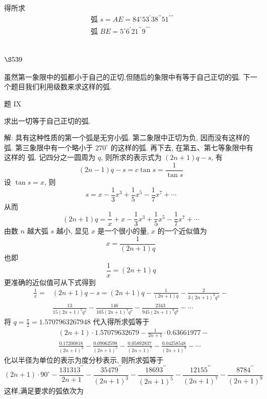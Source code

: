 得所求
\[
\begin{gathered}
\text { 弧 } s=A E=84^{\circ} 53^{\prime} 38^{\prime \prime} 51^{\prime \prime \prime} \\
\text { 弧 } B E=5^{\circ} 6^{\prime} 21^{\prime \prime} 9^{\prime \prime \prime}
\end{gathered}
\]
\section{$\S 539$}

虽然第一象限中的弧都小于自己的正切,但随后的象限中有等于自己正切的弧. 下一个题目我们利用级数来求这样的弧.

题 IX

求出一切等于自己正切的弧.

解: 具有这种性质的第一个弧是无穷小弧. 第二象限中正切为负, 因而没有这样的 弧. 第三象限中有一个略小于 $270^{\circ}$ 的这样的弧. 再下去, 在第五、第七等象限中有这样的 弧. 记四分之一圆周为 $q$, 则所求的表示式为 $(2 n+1) q-s$, 有
\[
(2 n-1) q-s=c \tan s=\frac{1}{\tan s}
\]
设 $\tan s=x$, 则
\[
s=x-\frac{1}{3} x^{3}+\frac{1}{5} x^{5}-\frac{1}{7} x^{7}+\cdots
\]
从而
\[
(2 n+1) q=\frac{1}{x}+x-\frac{1}{3} x^{3}+\frac{1}{5} x^{5}-\frac{1}{7} x^{7}+\cdots
\]
由数 $n$ 越大弧 $s$ 越小, 显见 $x$ 是一个很小的量, $x$ 的一个近似值为
\[
x=\frac{1}{(2 n+1) q}
\]
也即
\[
\frac{1}{x}=(2 n+1) q
\]
更准确的近似值可从下式得到
\[
\begin{aligned}
\frac{1}{x}= & (2 n+1) q-s=(2 n+1) q-\frac{1}{(2 n+1) q}-\frac{2}{3(2 n+1)^{3} q^{3}}- \\
& \frac{13}{15(2 n+1)^{5} q^{5}}-\frac{146}{105(2 n+1)^{7} q^{7}}-\frac{2343}{945(2 n+1)^{9} q^{9}}-\cdots
\end{aligned}
\]
将 $q=\frac{\pi}{2}=1.5707963267948$ 代入得所求弧等于
\[
\begin{aligned}
& (2 n+1) \cdot 1.57079632679-\frac{1}{2 n+1} \cdot 0.63661977- \\
& \frac{0.17200818}{(2 n+1)^{3}}-\frac{0.09062598}{(2 n+1)^{5}}-\frac{0.05892837}{(2 n+1)^{7}}-\frac{0.04258548}{(2 n+1)^{9}}-\cdots
\end{aligned}
\]
化以半径为单位的表示为度分秒表示, 则所求弧等于
\[
(2 n+1) \cdot 90^{\circ}-\frac{131313^{\prime \prime}}{2 n+1}-\frac{35479^{\prime \prime}}{(2 n+1)^{3}}-\frac{18693^{\prime \prime}}{(2 n+1)^{5}}-\frac{12155^{\prime \prime}}{(2 n+1)^{7}}-\frac{8784^{\prime \prime}}{(2 n+1)^{9}}
\]
这样,满足要求的弧依次为
